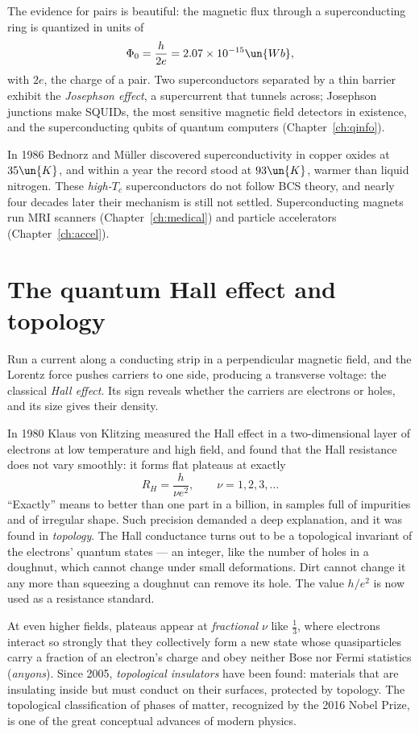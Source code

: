 The evidence for pairs is beautiful: the magnetic flux through a superconducting ring is quantized in units of
\[
  \Phi_0 = \frac{h}{2e} = 2.07\times10^{-15}\un{Wb},
\]
with $2e$, the charge of a pair. Two superconductors separated by a thin barrier exhibit the \emph{Josephson effect}, a supercurrent that tunnels across; Josephson junctions make SQUIDs, the most sensitive magnetic field detectors in existence, and the superconducting qubits of quantum computers (Chapter~\ref{ch:qinfo}).

In 1986 Bednorz and M\"uller discovered superconductivity in copper oxides at $35\un{K}$, and within a year the record stood at $93\un{K}$, warmer than liquid nitrogen. These \emph{high-$T_c$} superconductors do not follow BCS theory, and nearly four decades later their mechanism is still not settled. Superconducting magnets run MRI scanners (Chapter~\ref{ch:medical}) and particle accelerators (Chapter~\ref{ch:accel}).

\section{The quantum Hall effect and topology}
\label{sec:hall-classic}

Run a current along a conducting strip in a perpendicular magnetic field, and the Lorentz force pushes carriers to one side, producing a transverse voltage: the classical \emph{Hall effect}. Its sign reveals whether the carriers are electrons or holes, and its size gives their density.

In 1980 Klaus von Klitzing measured the Hall effect in a two-dimensional layer of electrons at low temperature and high field, and found that the Hall resistance does not vary smoothly: it forms flat plateaus at exactly
\[
  R_H = \frac{h}{\nu e^2},\qquad\nu = 1,2,3,\dots
\]
``Exactly'' means to better than one part in a billion, in samples full of impurities and of irregular shape. Such precision demanded a deep explanation, and it was found in \emph{topology}. The Hall conductance turns out to be a topological invariant of the electrons' quantum states --- an integer, like the number of holes in a doughnut, which cannot change under small deformations. Dirt cannot change it any more than squeezing a doughnut can remove its hole. The value $h/e^2$ is now used as a resistance standard.

At even higher fields, plateaus appear at \emph{fractional} $\nu$ like $\tfrac13$, where electrons interact so strongly that they collectively form a new state whose quasiparticles carry a fraction of an electron's charge and obey neither Bose nor Fermi statistics (\emph{anyons}). Since 2005, \emph{topological insulators} have been found: materials that are insulating inside but must conduct on their surfaces, protected by topology. The topological classification of phases of matter, recognized by the 2016 Nobel Prize, is one of the great conceptual advances of modern physics.

